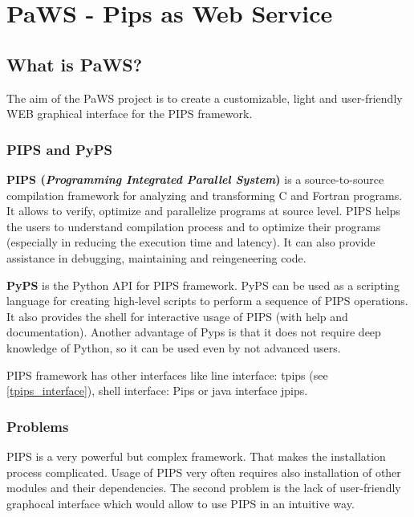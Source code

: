 \section{PaWS - Pips as Web Service}

\subsection{What is PaWS?}

The aim of the PaWS project is to create a customizable, light and user-friendly WEB graphical interface for the PIPS framework.

\subsubsection{PIPS and PyPS}
\label{pips_and_pyps}

{\bf PIPS (\emph{Programming Integrated Parallel System})} is a source-to-source compilation framework for analyzing and transforming C and Fortran programs\cite{pips4u}. It allows to verify, optimize and parallelize programs at source level. PIPS helps the users to understand compilation process and to optimize their programs (especially in reducing the execution time and latency). It can also provide assistance in debugging, maintaining and reingeneering code.

{\bf PyPS} is the Python API for PIPS framework. PyPS can be used as a scripting language for creating high-level scripts to perform a sequence of PIPS operations. It also provides the shell for interactive usage of PIPS (with help and documentation). Another advantage of Pyps is that it does not require deep knowledge of Python, so it can be used even by not advanced users.

PIPS framework has other interfaces like line interface: tpips (see \ref{tpips_interface}), shell interface: Pips or java interface jpips.


\subsubsection{Problems}

PIPS is a very powerful but complex framework. That makes the installation process complicated. Usage of PIPS very often requires also installation of other modules and their dependencies. The second problem is the lack of user-friendly graphocal interface which would allow to use PIPS in an intuitive way.

